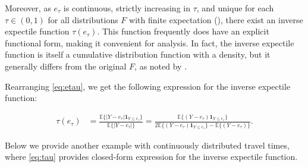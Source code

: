 \documentclass[preprint, 3p, authoryear]{elsarticle} %
\theoremstyle{definition}
\theoremstyle{definition}
\theoremstyle{definition}
\theoremstyle{definition}
\theoremstyle{remark}
\begin{document}
Moreover, as \(e_\tau\) is continuous, strictly increasing in \(\tau\), and unique for each \(\tau\in(0,1)\) for all distributions \(F\) with finite expectation (\citet{holzmann2016}), there exist an inverse expectile function \(\tau(e_\tau)\). This function frequently does have an explicit functional form, making it convenient for analysis. In fact, the inverse expectile function is itself a cumulative distribution function with a density, but it generally differs from the original \(F\), as noted by \citet{philipps2022}.

Rearranging \eqref{eq:etau}, we get the following expression for the inverse expectile function:

\begin{align}
\tau(e_\tau) &= \frac{\mathbb E\{|Y-e_\tau|\mathbf 1_{Y\leq e_\tau}\}} {\mathbb E\{|Y-e_\tau|\}} = \frac{\mathbb E\{(Y-e_\tau)\mathbf 1_{Y\leq e_\tau}\}}{2\mathbb E\{(Y-e_\tau)\mathbf 1_{Y\leq e_\tau}\} - \mathbb E\{(Y-e_\tau)\}}. \label{eq:tau}
\end{align}

Below we provide another example with continuously distributed travel times, where \eqref{eq:tau} provides closed-form expression for the inverse expectile function.
\end{document}
